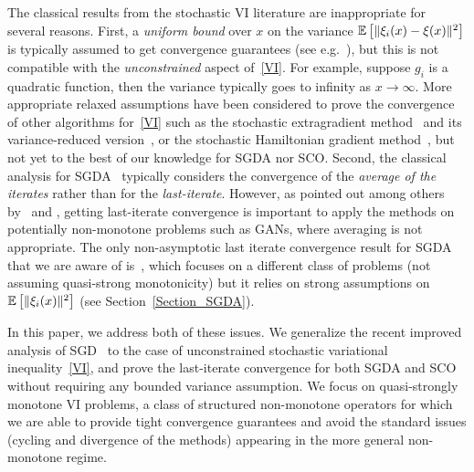 \documentclass{article}
\begin{document}
The classical results from the stochastic VI literature are inappropriate for several reasons. First, a \emph{uniform bound} over $x$ on the variance ${\mathbb{E}\left[\|\xi_i(x) - \xi(x)\|^2\right] }$ is typically assumed to get convergence guarantees (see e.g.~\citet{Nemirovski-Juditsky-Lan-Shapiro-2009,gidel2018variational,mertikopoulos2019games,yang2020global,lin2020finite}), but this is not compatible with the \emph{unconstrained} aspect of~\eqref{VI}. For example, suppose $g_i$ is a quadratic function, then the variance typically goes to infinity as $x \rightarrow \infty$. More appropriate relaxed assumptions have been considered to prove the convergence of other algorithms for~\eqref{VI} such as the stochastic extragradient method~\citep{hsieh2020explore,mishchenko2020revisiting} and its variance-reduced version~\citep{chavdarova2019reducing}, or the stochastic Hamiltonian gradient method~\citep{loizou2020stochastic}, but not yet to the best of our knowledge for SGDA nor SCO. Second, the classical analysis for SGDA~\citep{Nemirovski-Juditsky-Lan-Shapiro-2009} typically considers the convergence of the \emph{average of the iterates} rather than for the \emph{last-iterate}. However, as pointed out among others by~\citet{daskalakis2017training} and \citet{chavdarova2019reducing}, getting last-iterate convergence is important to apply the methods on potentially non-monotone problems such as GANs, where averaging is not appropriate. The only non-asymptotic last iterate convergence result for SGDA that we are aware of is~\cite{lin2020finite}, which focuses on a different class of problems (not assuming quasi-strong monotonicity) but it relies on strong assumptions on ${\mathbb{E}\left[\|\xi_i(x)\|^2\right] }$ (see Section~\ref{Section_SGDA}). 

In this paper, we address both of these issues. We generalize the recent improved analysis of SGD~\citep{gower2019sgd} to the case of unconstrained stochastic variational inequality~\eqref{VI}, and prove the last-iterate convergence for both SGDA and SCO without requiring any bounded variance assumption. We focus on quasi-strongly monotone VI problems, a class of structured non-monotone operators for which we are able to provide tight convergence guarantees and avoid the standard issues (cycling and divergence of the methods) appearing in the more general non-monotone regime.
\end{document}
